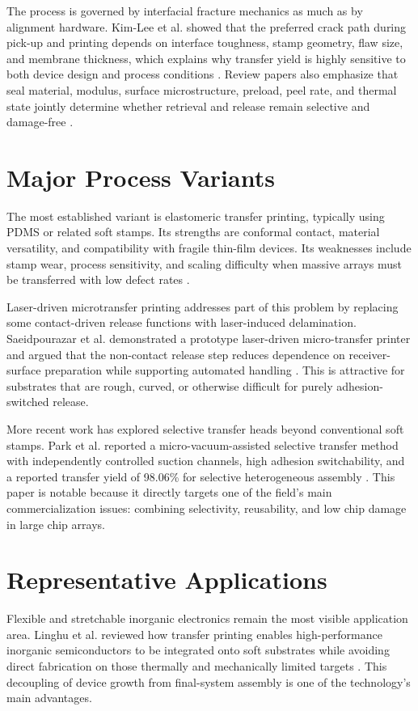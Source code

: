 \documentclass[11pt,a4paper]{article}
\begin{document}
The process is governed by interfacial fracture mechanics as much as by alignment hardware. Kim-Lee et al. showed that the preferred crack path during pick-up and printing depends on interface toughness, stamp geometry, flaw size, and membrane thickness, which explains why transfer yield is highly sensitive to both device design and process conditions \cite{kimlee2014}. Review papers also emphasize that seal material, modulus, surface microstructure, preload, peel rate, and thermal state jointly determine whether retrieval and release remain selective and damage-free \cite{linghu2018, zhang2021}.

\section{Major Process Variants}
The most established variant is elastomeric transfer printing, typically using PDMS or related soft stamps. Its strengths are conformal contact, material versatility, and compatibility with fragile thin-film devices. Its weaknesses include stamp wear, process sensitivity, and scaling difficulty when massive arrays must be transferred with low defect rates \cite{carlson2012, linghu2018}.

Laser-driven microtransfer printing addresses part of this problem by replacing some contact-driven release functions with laser-induced delamination. Saeidpourazar et al. demonstrated a prototype laser-driven micro-transfer printer and argued that the non-contact release step reduces dependence on receiver-surface preparation while supporting automated handling \cite{saeidpourazar2012}. This is attractive for substrates that are rough, curved, or otherwise difficult for purely adhesion-switched release.

More recent work has explored selective transfer heads beyond conventional soft stamps. Park et al. reported a micro-vacuum-assisted selective transfer method with independently controlled suction channels, high adhesion switchability, and a reported transfer yield of 98.06\% for selective heterogeneous assembly \cite{park2023vacuum}. This paper is notable because it directly targets one of the field's main commercialization issues: combining selectivity, reusability, and low chip damage in large chip arrays.

\section{Representative Applications}
Flexible and stretchable inorganic electronics remain the most visible application area. Linghu et al. reviewed how transfer printing enables high-performance inorganic semiconductors to be integrated onto soft substrates while avoiding direct fabrication on those thermally and mechanically limited targets \cite{linghu2018}. This decoupling of device growth from final-system assembly is one of the technology's main advantages.
\end{document}
